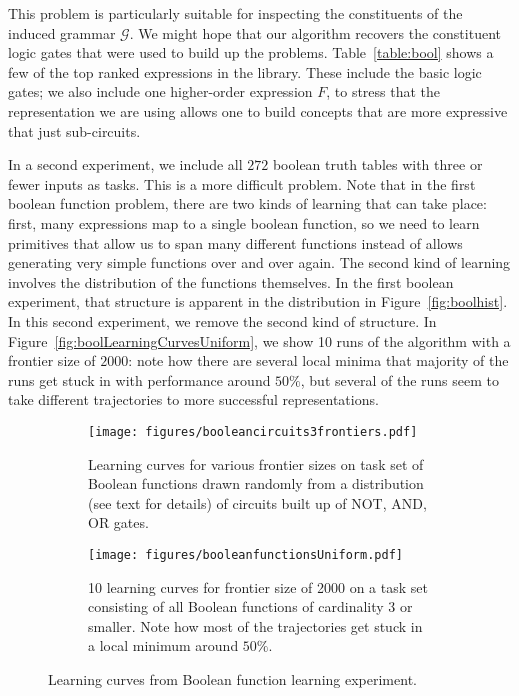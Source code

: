 \documentclass{article}
\begin{document}
This problem is particularly suitable for inspecting the constituents
of the induced grammar $\mathcal{G}$. We might hope that our algorithm
recovers the constituent logic gates that were used to build up the
problems. Table~\ref{table:bool} shows a few of the top ranked
expressions in the library. These include the basic logic gates; we
also include one higher-order expression $F$, to stress that the
representation we are using allows one to build concepts that are more
expressive that just sub-circuits.

In a second experiment, we include all $272$ boolean truth tables with
three or fewer inputs as tasks. This is a more difficult problem. Note
that in the first boolean function problem, there are two kinds of
learning that can take place: first, many expressions map to a single
boolean function, so we need to learn primitives that allow us to span
many different functions instead of allows generating very simple
functions over and over again. The second kind of learning involves
the distribution of the functions themselves. In the first boolean
experiment, that structure is apparent in the distribution in
Figure~\ref{fig:boolhist}. In this second experiment, we remove the
second kind of structure. In Figure~\ref{fig:boolLearningCurvesUniform}, we show
10 runs of the algorithm with a frontier size of $2000$: note how
there are several local minima that majority of the runs get stuck in
with performance around $50\%$, but several of the runs seem to take
different trajectories to more successful representations. 

\begin{figure}[t]
\begin{subfigure}[Before]{\linewidth}
\texttt{[image: figures/booleancircuits3frontiers.pdf]}
\label{fig:boolLearningCurvesCircuits}
\caption{Learning curves for various frontier sizes on task set of
  Boolean functions drawn randomly from a distribution (see text for
  details) of circuits built up of NOT, AND, OR gates.}
\end{subfigure}

\begin{subfigure}[Before]{\linewidth}
\texttt{[image: figures/booleanfunctionsUniform.pdf]}
\label{fig:boolLearningCurvesUnifrom}
\caption{10 learning curves for frontier size of 2000 on a task set
  consisting of all Boolean functions of cardinality 3 or
  smaller. Note how most of the trajectories get stuck in a local
  minimum around $50\%$.}
\end{subfigure}
\label{fig:boolLearningCurves} 
\caption{Learning curves from Boolean function learning experiment. }
\end{figure}
\end{document}

